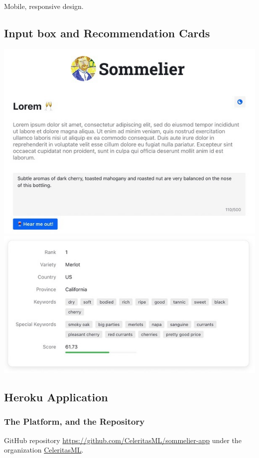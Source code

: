 \documentclass[
]{kaohandt}
\begin{document}
Mobile, responsive design.

\subsection*{Input box and Recommendation Cards}

\includegraphics[]{sommelier-view-03.jpg}
\includegraphics[]{sommelier-view-04.jpg}

\subsection*{Heroku Application}

\subsubsection*{The Platform, and the Repository}

GitHub repository \href{https://github.com/CeleritasML/sommelier-app}{https://github.com/CeleritasML/sommelier-app} under the organization \href{https://github.com/CeleritasML}{CeleritasML}.
\end{document}

